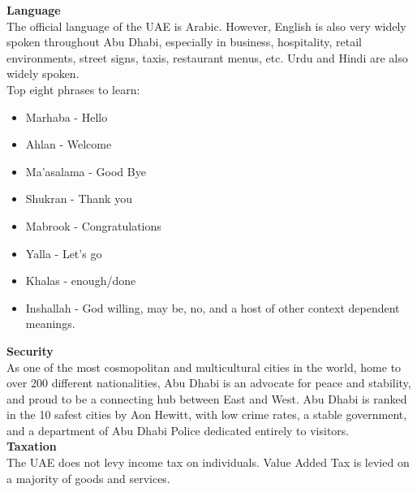 {\large \textbf{Language}}\\
The official language of the UAE is Arabic. However, English is also very widely spoken throughout Abu Dhabi, 
especially in business, hospitality, retail environments, street signs, taxis, restaurant menus, etc.
Urdu and Hindi are also widely spoken.\\
Top eight phrases to learn:
\begin{itemize}
    \item Marhaba - Hello
    \item Ahlan - Welcome
    \item Ma’asalama - Good Bye
    \item Shukran - Thank you
    \item Mabrook - Congratulations
    \item Yalla - Let’s go
    \item Khalas - enough/done
    \item Inshallah - God willing, may be, no, and a host of other context dependent meanings.
\end{itemize}

{\large \textbf{Security}}\\
As one of the most cosmopolitan and multicultural cities in the world, home to over 200 different nationalities, 
 Abu Dhabi is an advocate for peace and stability, and proud to be a connecting hub between East and West.
Abu Dhabi is ranked in the 10 safest cities by Aon Hewitt, with low crime rates, a stable government,
 and a department of Abu Dhabi Police dedicated entirely to visitors.\\

{\large \textbf{Taxation}}\\
The UAE does not levy income tax on individuals. Value Added Tax is levied on a majority of goods and services.\\

